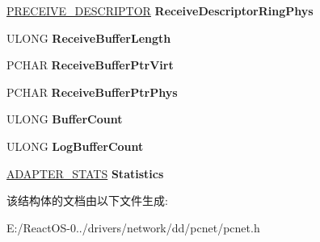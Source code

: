 \begin{DoxyCompactItemize}
\item 
\mbox{\label{struct___a_d_a_p_t_e_r_a075ea6c2fb2e31deb95a393a8a3ee513}} 
\hyperlink{struct___r_e_c_e_i_v_e___d_e_s_c_r_i_p_t_o_r}{P\+R\+E\+C\+E\+I\+V\+E\+\_\+\+D\+E\+S\+C\+R\+I\+P\+T\+OR} {\bfseries Receive\+Descriptor\+Ring\+Phys}
\item 
\mbox{\label{struct___a_d_a_p_t_e_r_a82326817fdfddef51daa7244b0db99a2}} 
U\+L\+O\+NG {\bfseries Receive\+Buffer\+Length}
\item 
\mbox{\label{struct___a_d_a_p_t_e_r_ad9280f019aee3ad173c471f633842e3b}} 
P\+C\+H\+AR {\bfseries Receive\+Buffer\+Ptr\+Virt}
\item 
\mbox{\label{struct___a_d_a_p_t_e_r_ab443c7ba74a0bfe8f04762c27fbc2443}} 
P\+C\+H\+AR {\bfseries Receive\+Buffer\+Ptr\+Phys}
\item 
\mbox{\label{struct___a_d_a_p_t_e_r_af5cc45613d6819ea6902df96c6326008}} 
U\+L\+O\+NG {\bfseries Buffer\+Count}
\item 
\mbox{\label{struct___a_d_a_p_t_e_r_a7b205ae8f4d06633570025b739218e73}} 
U\+L\+O\+NG {\bfseries Log\+Buffer\+Count}
\item 
\mbox{\label{struct___a_d_a_p_t_e_r_a6500bf6e852de4beae3f88e5d9ccc0d0}} 
\hyperlink{struct___a_d_a_p_t_e_r___s_t_a_t_s}{A\+D\+A\+P\+T\+E\+R\+\_\+\+S\+T\+A\+TS} {\bfseries Statistics}
\end{DoxyCompactItemize}


该结构体的文档由以下文件生成\+:\begin{DoxyCompactItemize}
\item 
E\+:/\+React\+O\+S-\/0../drivers/network/dd/pcnet/pcnet.\+h\end{DoxyCompactItemize}
